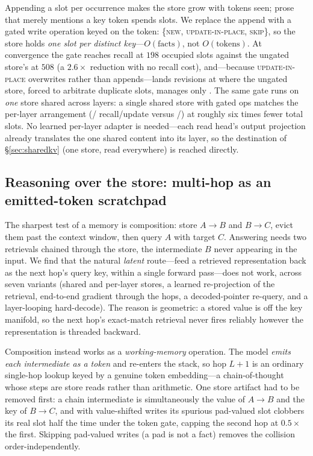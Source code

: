 Appending a slot per occurrence makes the store grow with tokens seen; prose that
merely mentions a key token spends slots. We replace the append with a gated write
operation keyed on the token: \{\textsc{new}, \textsc{update-in-place},
\textsc{skip}\}, so the store holds \emph{one slot per distinct key}---$O(\text{facts})$,
not $O(\text{tokens})$. At convergence the gate reaches  recall at $198$
occupied slots against the ungated store's  at $508$ (a $2.6\times$
reduction with no recall cost), and---because \textsc{update-in-place} overwrites
rather than appends---lands revisions at  where the ungated store, forced
to arbitrate duplicate slots, manages only . The same gate runs on
\emph{one} store shared across layers: a single shared store with gated ops matches
the per-layer arrangement (/ recall/update versus
/) at roughly six times fewer total slots. No learned
per-layer adapter is needed---each read head's output projection already translates
the one shared content into its layer, so the destination of \S\ref{sec:sharedkv} (one
store, read everywhere) is reached directly.

\subsection{Reasoning over the store: multi-hop as an emitted-token scratchpad}
\label{sec:memory:multihop}

The sharpest test of a memory is composition: store $A\!\to\!B$ and $B\!\to\!C$,
evict them past the context window, then query $A$ with target $C$. Answering needs
two retrievals chained through the store, the intermediate $B$ never appearing in the
input. We find that the natural \emph{latent} route---feed a retrieved representation
back as the next hop's query key, within a single forward pass---does not work, across
seven variants (shared and per-layer stores, a learned re-projection of the retrieval,
end-to-end gradient through the hops, a decoded-pointer re-query, and a layer-looping
hard-decode). The reason is geometric: a stored value is off the key manifold, so the
next hop's exact-match retrieval never fires reliably however the representation is
threaded backward.

Composition instead works as a \emph{working-memory} operation. The model
\emph{emits each intermediate as a token} and re-enters the stack, so hop $L\!+\!1$ is
an ordinary single-hop lookup keyed by a genuine token embedding---a chain-of-thought
whose steps are store reads rather than arithmetic. One store artifact had to be
removed first: a chain intermediate is simultaneously the value of $A\!\to\!B$ and the
key of $B\!\to\!C$, and with value-shifted writes its spurious pad-valued slot
clobbers its real slot half the time under the token gate, capping the second hop at
$0.5\times$ the first. Skipping pad-valued writes (a pad is not a fact) removes the
collision order-independently.

